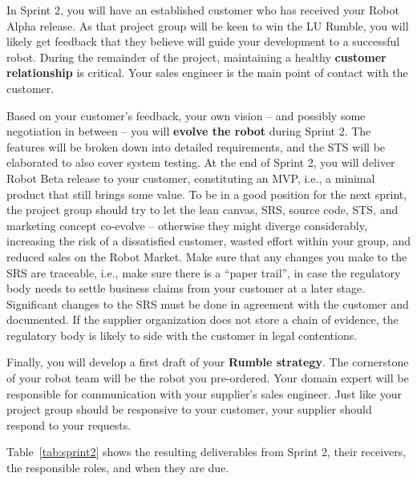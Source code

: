 \documentclass{scrreprt}
\begin{document}
In Sprint 2, you will have an established customer who has received your Robot Alpha release. As that project group will be keen to win the LU Rumble, you will likely get feedback that they believe will guide your development to a successful robot. During the remainder of the project, maintaining a healthy \textbf{customer relationship} is critical. Your sales engineer is the main point of contact with the customer.

Based on your customer's feedback, your own vision -- and possibly some negotiation in between -- you will \textbf{evolve the robot} during Sprint 2. The features will be broken down into detailed requirements, and the STS will be elaborated to also cover system testing. At the end of Sprint 2, you will deliver Robot Beta release to your customer, constituting an MVP, i.e., a minimal product that still brings some value. To be in a good position for the next sprint, the project group should try to let the lean canvas, SRS, source code, STS, and marketing concept co-evolve -- otherwise they might diverge considerably, increasing the risk of a dissatisfied customer, wasted effort within your group, and reduced sales on the Robot Market. Make sure that any changes you make to the SRS are traceable, i.e., make sure there is a ``paper trail'', in case the regulatory body needs to settle business claims from your customer at a later stage. Significant changes to the SRS must be done in agreement with the customer and documented. If the supplier organization does not store a chain of evidence, the regulatory body is likely to side with the customer in legal contentions.

Finally, you will develop a first draft of your \textbf{Rumble strategy}. The cornerstone of your robot team will be the robot you pre-ordered. Your domain expert will be responsible for communication with your supplier's sales engineer. Just like your project group should be responsive to your customer, your supplier should respond to your requests.

Table~\ref{tab:sprint2} shows the resulting deliverables from Sprint 2, their receivers, the responsible roles, and when they are due.
\end{document}
